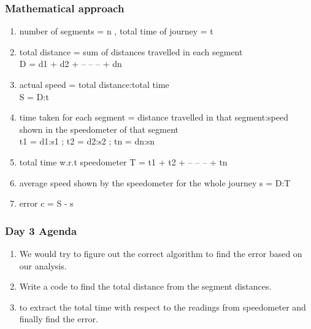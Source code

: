 \documentclass{beamer}
\begin{document}
    \begin{frame}
	    \frametitle{Mathematical approach}
	    \begin{enumerate}
		\item number of segments = n , total time of journey = t
		\item total distance = sum of distances travelled in each segment\\D = d1 + d2 + -- -- -- + dn
		\item actual speed = total distance:total time\\S = D:t
		\item time taken for each segment = distance travelled in that segment:speed shown in the speedometer of that segment\\t1 = d1:s1 ; t2 = d2:s2 ; tn = dn:sn
		\item total time w.r.t speedometer T = t1 + t2 + -- -- -- + tn
		\item average speed shown by the speedometer for the whole journey s = D:T
		\item error c = S - s
	    \end{enumerate}
    \end{frame}

    \begin{frame}
	    \frametitle{Day 3 Agenda}
	    \begin{enumerate}
		\item We would try to figure out the correct algorithm to find the error based on our analysis.
		\item Write a code to find the total distance from the segment distances.
		\item to extract the total time with respect to the readings from speedometer and finally find the error.
	    \end{enumerate}
    \end{frame}
\end{document}
